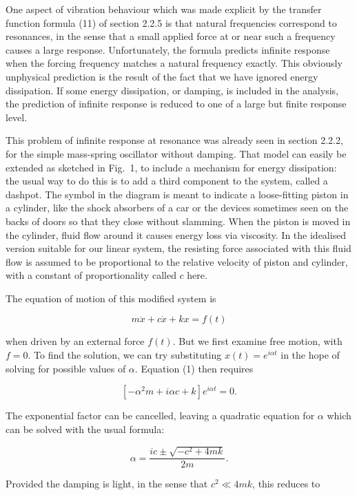   One aspect of vibration behaviour which was made explicit by the transfer 
  function formula (11) of section 2.2.5 is that natural frequencies correspond 
  to resonances, in the sense that a small applied force at or near such a 
  frequency causes a large response. Unfortunately, the formula predicts 
  infinite response when the forcing frequency matches a natural frequency 
  exactly. This obviously unphysical prediction is the result of the fact that 
  we have ignored energy dissipation. If some energy dissipation, or damping, 
  is included in the analysis, the prediction of infinite response is reduced 
  to one of a large but finite response level. 

  This problem of infinite response at resonance was already seen in section 
  2.2.2, for the simple mass-spring oscillator without damping. That model can 
  easily be extended as sketched in Fig.\ 1, to include a mechanism for energy 
  dissipation: the usual way to do this is to add a third component to the 
  system, called a dashpot. The symbol in the diagram is meant to indicate a 
  loose-fitting piston in a cylinder, like the shock absorbers of a car or the 
  devices sometimes seen on the backs of doors so that they close without 
  slamming. When the piston is moved in the cylinder, fluid flow around it 
  causes energy loss via viscosity. In the idealised version suitable for our 
  linear system, the resisting force associated with this fluid flow is assumed 
  to be proportional to the relative velocity of piston and cylinder, with a 
  constant of proportionality called $c$ here. 

  The equation of motion of this modified system is 

  $$m \ddot{x}+c\dot{x} +kx=f(t) \tag{1} $$ 

  when driven by an external force $f(t)$. But we first examine free motion, 
  with $f=0$. To find the solution, we can try substituting $x(t)=e^{i \alpha 
  t}$ in the hope of solving for possible values of $\alpha$. Equation (1) then 
  requires 

  $$[-\alpha^2 m +i \alpha c + k] e^{i \alpha t} =0. \tag{2} $$ 

  The exponential factor can be cancelled, leaving a quadratic equation for 
  $\alpha$ which can be solved with the usual formula: 

  $$\alpha = \dfrac{ic \pm \sqrt{-c^2 + 4 m k}}{2m}. \tag{3}$$ 

  Provided the damping is light, in the sense that $c^2 \ll 4mk$, this reduces 
  to 

